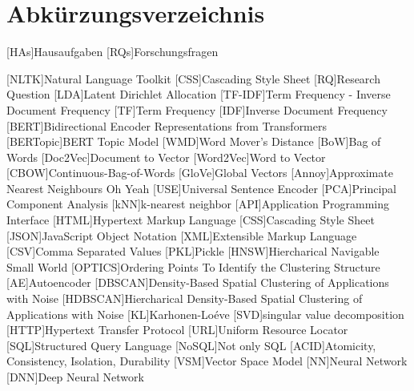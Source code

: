 \chapter*{Abkürzungsverzeichnis}


[HAs]{Hausaufgaben}
[RQs]{Forschungsfragen}

\begin{acronym}[XXXXXX]
    [NLTK]{Natural Language Toolkit}
    [CSS]{Cascading Style Sheet}
    [RQ]{Research Question}
    [LDA]{Latent Dirichlet Allocation}
    [TF-IDF]{Term Frequency - Inverse Document Frequency}
    [TF]{Term Frequency}
    [IDF]{Inverse Document Frequency}
    [BERT]{Bidirectional Encoder Representations from Transformers}
    [BERTopic]{BERT Topic Model}
    [WMD]{Word Mover's Distance}
    [BoW]{Bag of Words}
    [Doc2Vec]{Document to Vector}
    [Word2Vec]{Word to Vector}
    [CBOW]{Continuous-Bag-of-Words}
    [GloVe]{Global Vectors}
    [Annoy]{Approximate Nearest Neighbours Oh Yeah}
    [USE]{Universal Sentence Encoder}
    [PCA]{Principal Component Analysis}
    [kNN]{k-nearest neighbor}
    [API]{Application Programming Interface}
    [HTML]{Hypertext Markup Language}
    [CSS]{Cascading Style Sheet}
    [JSON]{JavaScript Object Notation}
    [XML]{Extensible Markup Language}
    [CSV]{Comma Separated Values}
    [PKL]{Pickle}
    [HNSW]{Hiercharical Navigable Small World}
    [OPTICS]{Ordering Points To Identify the Clustering Structure}
    [AE]{Autoencoder}
    [DBSCAN]{Density-Based Spatial Clustering of Applications with Noise}
    [HDBSCAN]{Hiercharical Density-Based Spatial Clustering of Applications with Noise}
    [KL]{Karhonen-Loéve}
    [SVD]{singular value decomposition}
    [HTTP]{Hypertext Transfer Protocol}
    [URL]{Uniform Resource Locator}
    [SQL]{Structured Query Language}
    [NoSQL]{Not only SQL}
    [ACID]{Atomicity, Consistency, Isolation, Durability}
    [VSM]{Vector Space Model}
    [NN]{Neural Network}
    [DNN]{Deep Neural Network}

\end{acronym}
